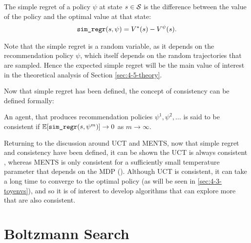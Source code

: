        \begin{defn}
            The \textnormal{simple regret} of a policy $\psi$ at state $s\in\mathcal{S}$ is the difference between the value of the policy and the optimal value at that state:
            \begin{align}
                {\textnormal{\texttt{sim\_regr}}}(s,\psi) = V^*(s)-V^{\psi}(s). \label{eq:4:simple_regret}
            \end{align}
        \end{defn}

        Note that the simple regret is a random variable, as it depends on the recommendation policy $\psi$, which itself depends on the random trajectories that are sampled. Hence the expected simple regret will be the main value of interest in the theoretical analysis of Section \ref{sec:4-5-theory}.

        Now that simple regret has been defined, the concept of consistency can be defined formally:

        \begin{defn}
            An agent, that produces recommendation policies $\psi^1,\psi^2,...$ is said to be \textnormal{consistent} if $\mathbb{E}[{\textnormal{\texttt{sim\_regr}}}(s,\psi^m)] \rightarrow 0$ as $m\rightarrow \infty$.
        \end{defn}

        Returning to the discussion around UCT and MENTS, now that simple regret and consistency have been defined, it can be shown the UCT is always consistent , whereas MENTS is only consistent for a sufficiently small temperature parameter that depends on the MDP (). Although UCT is consistent, it can take a long time to converge to the optimal policy (as will be seen in \ref{sec:4-3-toyenvs}), and so it is of interest to develop algorithms that can explore more that are also consistent.
    










\section{Boltzmann Search}
\label{sec:4-2-boltzmannsearch}

